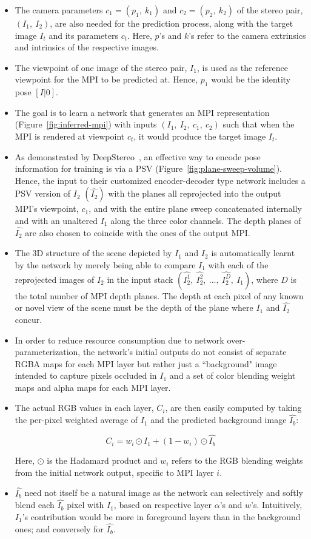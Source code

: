 \begin{itemize}
    \item The camera parameters $c_1 = (p_1,\ k_1)$ and $c_2 = (p_2,\ k_2)$ of the stereo pair, $(I_1,\ I_2)$, are also needed for the prediction process, along with the target image $I_t$ and its parameters $c_t$. Here, $p$'s and $k$'s refer to the camera extrinsics and intrinsics of the respective images.
    \item The viewpoint of one image of the stereo pair, $I_1$, is used as the reference viewpoint for the MPI to be predicted at. Hence, $p_1$ would be the identity pose $[I|\boldsymbol{\mathit{0}}]$.
    \item The goal is to learn a network that generates an MPI representation (Figure~\ref{fig:inferred-mpi}) with inputs $(I_1,\ I_2,\ c_1,\ c_2)$ such that when the MPI is rendered at viewpoint $c_t$, it would produce the target image $I_t$. 
    \item As demonstrated by DeepStereo~\cite{deep_stereo_2016}, an effective way to encode pose information for training is via a PSV (Figure~\ref{fig:plane-sweep-volume}). Hence, the input to their customized encoder-decoder type network includes a PSV version of $I_2$ $(\hat{I_2})$ with the planes all reprojected into the output MPI's viewpoint, $c_1$, and with the entire plane sweep concatenated internally and with an unaltered $I_1$ along the three color channels. The depth planes of $\hat{I_2}$ are also chosen to coincide with the ones of the output MPI.
    \item The 3D structure of the scene depicted by $I_1$ and $I_2$ is automatically learnt by the network by merely being able to compare $I_1$ with each of the reprojected images of $I_2$ in the input stack $(\hat{I_2^1},\ \hat{I_2^2},\ \ldots,\ \hat{I_2^D},\  I_1)$, where $D$ is the total number of MPI depth planes. The depth at each pixel of any known or novel view of the scene must be the depth of the plane where $I_1$ and $\hat{I_2}$ concur.
    \item In order to reduce resource consumption due to network over-parameterization, the network's initial outputs do not consist of separate RGBA maps for each MPI layer but rather just a ``background" image intended to capture pixels occluded in $I_1$ and a set of color blending weight maps and alpha maps for each MPI layer.
    \item The actual RGB values in each layer, $C_i$, are then easily computed by taking the per-pixel weighted average of $I_1$ and the predicted background image $\hat{I_b}$:
    
    \[C_i = w_i \odot I_1 + (1 - w_i) \odot \hat{I_b}\]
    
    Here, $\odot$ is the Hadamard product and $w_i$ refers to the RGB blending weights from the initial network output, specific to MPI layer $i$.
    \item $\hat{I_b}$ need not itself be a natural image as the network can selectively and softly blend each $\hat{I_b}$ pixel with $I_1$, based on respective layer $\alpha$'s and $w$'s. Intuitively, $I_1$'s contribution would be more in foreground layers than in the background ones; and conversely for $\hat{I_b}$. 
\end{itemize}

